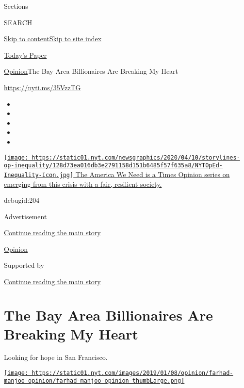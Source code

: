 Sections

SEARCH

\protect\hyperlink{site-content}{Skip to
content}\protect\hyperlink{site-index}{Skip to site index}

\href{https://myaccount.nytimes.com/auth/login?response_type=cookie\&client_id=vi}{}

\href{https://www.nytimes.com/section/todayspaper}{Today's Paper}

\href{/section/opinion}{Opinion}\textbar{}The Bay Area Billionaires Are
Breaking My Heart

\href{https://nyti.ms/35VzzTG}{https://nyti.ms/35VzzTG}

\begin{itemize}
\item
\item
\item
\item
\item
\end{itemize}

\href{https://www.nytimes.com/interactive/2020/opinion/america-inequality-coronavirus.html?action=click\&pgtype=Article\&state=default\&region=TOP_BANNER\&context=storylines_menu}{\texttt{[image: https://static01.nyt.com/newsgraphics/2020/04/10/storylines-op-inequality/128d73ea016db3e2791158d151b6485f57f635a8/NYTOpEd-Inequality-Icon.jpg]}
The America We Need is a Times Opinion series on emerging from this
crisis with a fair, resilient society. }

debugid:204

Advertisement

\protect\hyperlink{after-top}{Continue reading the main story}

\href{/section/opinion}{Opinion}

Supported by

\protect\hyperlink{after-sponsor}{Continue reading the main story}

\hypertarget{the-bay-area-billionaires-are-breaking-my-heart}{%
\section{The Bay Area Billionaires Are Breaking My
Heart}\label{the-bay-area-billionaires-are-breaking-my-heart}}

Looking for hope in San Francisco.

\href{https://www.nytimes.com/by/farhad-manjoo}{\texttt{[image: https://static01.nyt.com/images/2019/01/08/opinion/farhad-manjoo-opinion/farhad-manjoo-opinion-thumbLarge.png]}}

